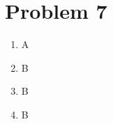 \documentclass{article}
\begin{document}
\section*{Problem 7}
\begin{enumerate}
\item A \\
\item B \\
\item B \\
\item B 
\end{enumerate}
\end{document}
